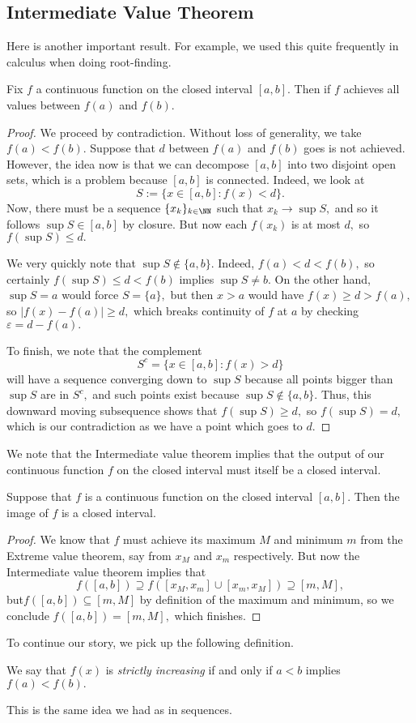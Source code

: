\documentclass[../notes.tex]{subfiles}
\begin{document}
\subsection{Intermediate Value Theorem}
Here is another important result. For example, we used this quite frequently in calculus when doing root-finding.
\begin{theorem}
	Fix $f$ a continuous function on the closed interval $[a,b].$ Then if $f$ achieves all values between $f(a)$ and $f(b).$
\end{theorem}
\begin{proof}
	We proceed by contradiction. Without loss of generality, we take $f(a)<f(b).$ Suppose that $d$ between $f(a)$ and $f(b)$ goes is not achieved. However, the idea now is that we can decompose $[a,b]$ into two disjoint open sets, which is a problem because $[a,b]$ is connected. Indeed, we look at
	\[S:=\{x\in[a,b]:f(x)<d\}.\]
	Now, there must be a sequence $\{x_k\}_{k\in\NN}$ such that $x_k\to\sup S,$ and so it follows $\sup S\in[a,b]$ by closure. But now each $f(x_k)$ is at most $d,$ so $f(\sup S)\le d.$

	We very quickly note that $\sup S\notin\{a,b\}.$ Indeed, $f(a)<d<f(b),$ so certainly $f(\sup S)\le d<f(b)$ implies $\sup S\ne b.$ On the other hand, $\sup S=a$ would force $S=\{a\},$ but then $x>a$ would have $f(x)\ge d>f(a),$ so $|f(x)-f(a)|\ge d,$ which breaks continuity of $f$ at $a$ by checking $\varepsilon=d-f(a).$

	To finish, we note that the complement
	\[S^c=\{x\in[a,b]:f(x)>d\}\]
	will have a sequence converging down to $\sup S$ because all points bigger than $\sup S$ are in $S^c,$ and such points exist because $\sup S\notin\{a,b\}.$ Thus, this downward moving subsequence shows that $f(\sup S)\ge d,$ so $f(\sup S)=d,$ which is our contradiction as we have a point which goes to $d.$
\end{proof}
We note that the Intermediate value theorem implies that the output of our continuous function $f$ on the closed interval must itself be a closed interval.
\begin{cor}
	Suppose that $f$ is a continuous function on the closed interval $[a,b].$ Then the image of $f$ is a closed interval.
\end{cor}
\begin{proof}
	We know that $f$ must achieve its maximum $M$ and minimum $m$ from the Extreme value theorem, say from $x_M$ and $x_m$ respectively. But now the Intermediate value theorem implies that
	\[f([a,b])\supseteq f\left([x_M,x_m]\cup[x_m,x_M]\right)\supseteq[m,M],\]
	but$ f\left([a,b]\right)\subseteq[m,M]$ by definition of the maximum and minimum, so we conclude $f([a,b])=[m,M],$ which finishes.
\end{proof}
To continue our story, we pick up the following definition.
\begin{definition}
	We say that $f(x)$ is \textit{strictly increasing} if and only if $a<b$ implies $f(a)<f(b).$
\end{definition}
This is the same idea we had as in sequences.
\end{document}
